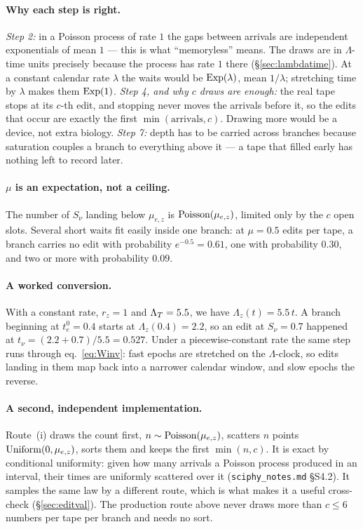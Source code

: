 \paragraph{Why each step is right.}
\emph{Step 2:} in a Poisson process of rate $1$ the gaps between arrivals are independent exponentials
of mean $1$ --- this is what ``memoryless'' means. The draws are in $\Lambda$-time units precisely
because the process has rate $1$ there (\S\ref{sec:lambdatime}). At a constant calendar rate $\lambda$
the waits would be $\operatorname{Exp}(\lambda)$, mean $1/\lambda$; stretching time by $\lambda$ makes them $\operatorname{Exp}(1)$.
\emph{Step 4, and why $c$ draws are enough:} the real tape stops at its $c$-th edit, and stopping never
moves the arrivals before it, so the edits that occur are exactly the first $\min(\text{arrivals},c)$.
Drawing more would be a device, not extra biology.
\emph{Step 7:} depth has to be carried across branches because saturation couples a branch to
everything above it --- a tape that filled early has nothing left to record later.

\paragraph{$\mu$ is an expectation, not a ceiling.} The number of $S_\nu$ landing below $\mu_{e,z}$ is
$\operatorname{Poisson}(\mu_{e,z})$, limited only by the $c$ open slots. Several short waits fit easily inside one
branch: at $\mu=0.5$ edits per tape, a branch carries no edit with probability $e^{-0.5}=0.61$, one
with probability $0.30$, and two or more with probability $0.09$.

\paragraph{A worked conversion.} With a constant rate, $r_z=1$ and $\Lambda_T=5.5$, we have
$\Lambda_z(t)=5.5\,t$. A branch beginning at $t_e^0=0.4$ starts at $\Lambda_z(0.4)=2.2$, so an edit at
$S_\nu=0.7$ happened at $t_\nu=(2.2+0.7)/5.5=0.527$. Under a piecewise-constant rate the same step runs
through eq.~\eqref{eq:Winv}: fast epochs are stretched on the $\Lambda$-clock, so edits landing in them
map back into a narrower calendar window, and slow epochs the reverse.

\paragraph{A second, independent implementation.} Route~(i) draws the count first,
$n\sim\operatorname{Poisson}(\mu_{e,z})$, scatters $n$ points $\operatorname{Uniform}(0,\mu_{e,z})$, sorts them and keeps the first
$\min(n,c)$. It is exact by conditional uniformity: given how many arrivals a Poisson process produced
in an interval, their times are uniformly scattered over it (\texttt{sciphy\_notes.md} \S S4.2). It
samples the same law by a different route, which is what makes it a useful cross-check
(\S\ref{sec:editval}). The production route above never draws more than $c\le6$ numbers per tape per
branch and needs no sort.

